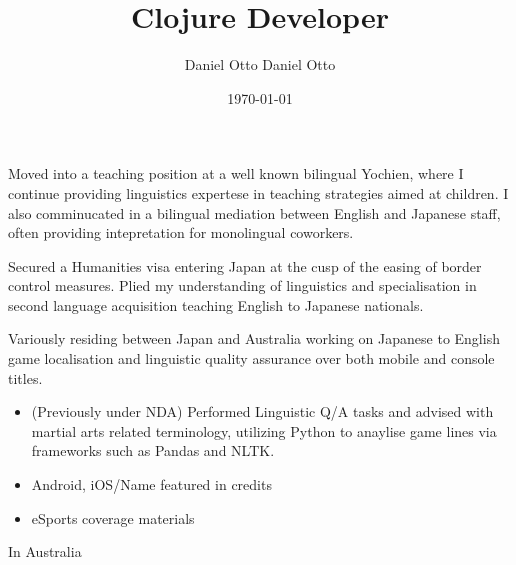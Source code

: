 \documentclass[10pt,a4paper,ragged2e,withhyper]{altacv}
\author{Daniel Otto Daniel Otto}
\date{\today}
\title{Clojure Developer}
\begin{document}

\makecvheader

\begin{paracol}{2}

\label{sec:org67501cc}
Moved into a teaching position at a well known bilingual Yochien, where I continue providing linguistics expertese in teaching strategies aimed at children. I also comminucated in a bilingual mediation between English and Japanese staff, often providing intepretation for monolingual coworkers.
\par\divider
{}
Secured a Humanities visa entering Japan at the cusp of the easing of border control measures. Plied my understanding of linguistics and specialisation in second language acquisition teaching English to Japanese nationals.
\par\divider
{}
Variously residing between Japan and Australia working on Japanese to English game localisation and linguistic quality assurance over both mobile and console titles.

\label{sec:org3c70af5}
\begin{itemize}
\item (Previously under NDA) Performed Linguistic Q/A tasks and advised with martial arts related terminology, utilizing Python to anaylise game lines via frameworks such as Pandas and NLTK.
\end{itemize}
\begin{itemize}
\item Android, iOS/Name featured in credits
\end{itemize}
\begin{itemize}
\item eSports coverage materials
\end{itemize}
\label{sec:orgdfaa340}
In Australia
\switchcolumn


\end{paracol}
\end{document}
